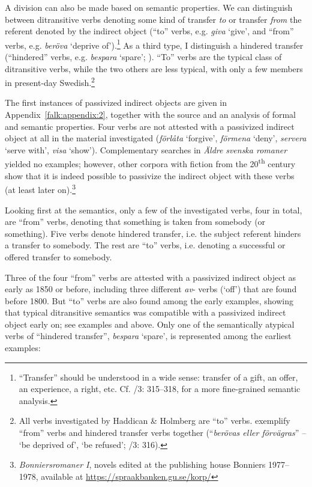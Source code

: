 \documentclass[output=paper]{langscibook}
\begin{document}
A division can also be made based on semantic properties. We can distinguish between ditransitive verbs denoting some kind of transfer \textit{to} or transfer \textit{from} the referent denoted by the indirect object (“to” verbs, e.g. \textit{giva} ‘give’, and “from” verbs, e.g. \textit{beröva} ‘deprive of’).\footnote{“Transfer” should be understood in a wide sense: transfer of a gift, an offer, an experience, a right, etc. Cf. \citealt{TelemanEtAl1999}/3: 315–318, \citet{Valdeson2021} for a more fine-grained semantic analysis.} As a third type, I distinguish a hindered transfer (“hindered” verbs, e.g. \textit{bespara} ‘spare’; \citealt{Valdeson2021}). “To” verbs are the typical class of ditransitive verbs, while the two others are less typical, with only a few members in present-day Swedish.\footnote{All verbs investigated by Haddican \& Holmberg are “to” verbs. \citet{TelemanEtAl1999} exemplify “from” verbs and hindered transfer verbs together (“\textit{berövas eller förvägras}” – ‘be deprived of’, ‘be refused’; \citealt{TelemanEtAl1999}/3: 316).} 



The first instances of passivized indirect objects are given in Appendix~\ref{falk:appendix:2}, together with the source and an analysis of formal and semantic properties. Four verbs are not attested with a passivized indirect object at all in the material investigated (\textit{förlåta} ‘forgive’, \textit{förmena} ‘deny’, \textit{servera} ‘serve with’, \textit{visa} ‘show’). Complementary searches in \textit{Äldre} \textit{svenska romaner} yielded no examples; however, other corpora with fiction from the 20\textsuperscript{th} century show that it is indeed possible to passivize the indirect object with these verbs (at least later on).\footnote{\textit{Bonniersromaner I}, novels edited at the publishing house Bonniers 1977–1978, available at \url{https://spraakbanken.gu.se/korp/}} 



Looking first at the semantics, only a few of the investigated verbs, four in total, are “from” verbs, denoting that something is taken from somebody (or something). Five verbs denote hindered transfer, i.e. the subject referent hinders a transfer to somebody. The rest are “to” verbs, i.e. denoting a successful or offered transfer to somebody. 



Three of the four “from” verbs are attested with a passivized indirect object as early as 1850 or before, including three different \textit{av}{}- verbs (‘off’) that are found before 1800. But “to” verbs are also found among the early examples, showing that typical ditransitive semantics was compatible with a passivized indirect object early on; see examples  and  above. Only one of the semantically atypical verbs of “hindered transfer”, \textit{bespara} ‘spare’, is represented among the earliest examples:
\end{document}
